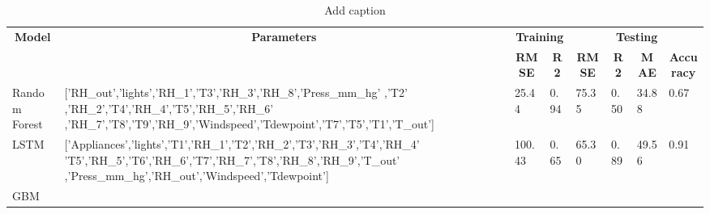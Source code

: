 \begin{table}[htbp]
  \centering
  \caption{Add caption}
    \begin{tabular}{|l|l|l|l|l|l|l|l|}
    \toprule
    \multicolumn{1}{|c|}{\multirow{2}[4]{*}{\textbf{Model}}} &
      \multicolumn{1}{c|}{\multirow{2}[4]{*}{\textbf{Parameters}}} &
      \multicolumn{2}{c|}{\textbf{Training}} &
      \multicolumn{4}{c|}{\textbf{Testing}}
      \\
\cmidrule{3-8}     &
       &
      \multicolumn{1}{c|}{\textbf{RMSE}} &
      \multicolumn{1}{c|}{\textbf{R2}} &
      \multicolumn{1}{c|}{\textbf{RMSE}} &
      \multicolumn{1}{c|}{\textbf{R2}} &
      \multicolumn{1}{c|}{\textbf{MAE}} &
      \multicolumn{1}{c|}{\textbf{Accuracy}}
      \\
    \midrule
    Random Forest &
      \multicolumn{1}{p{16.61em}|}{['RH\_out','lights','RH\_1','T3','RH\_3','RH\_8','Press\_mm\_hg' ,'T2' ,'RH\_2','T4','RH\_4','T5','RH\_5','RH\_6' ,'RH\_7','T8','T9','RH\_9','Windspeed','Tdewpoint','T7','T5','T1','T\_out']} &
      25.44 &
      0.94 &
      75.35 &
      0.50 &
      34.88 &
      0.67
      \\
    \midrule
    LSTM &
      \multicolumn{1}{p{16.61em}|}{['Appliances','lights','T1','RH\_1','T2','RH\_2','T3','RH\_3','T4','RH\_4'
 'T5','RH\_5','T6','RH\_6','T7','RH\_7','T8','RH\_8','RH\_9','T\_out'
,'Press\_mm\_hg','RH\_out','Windspeed','Tdewpoint']} &
      100.43 &
      0.65 &
      65.30 &
      0.89 &
      49.56 &
      0.91
      \\
    \midrule
    GBM &
       &
       &
       &
       &
       &
       &
      
      \\
    \bottomrule
    \end{tabular}%
  \label{tab:addlabel}%
\end{table}%
